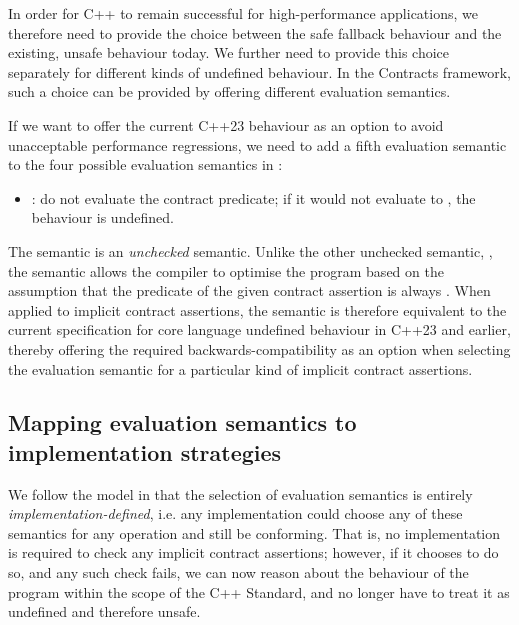 In order for C++ to remain successful for high-performance applications, we therefore need to provide the choice between the safe fallback behaviour and the existing, unsafe behaviour today. We further need to provide this choice separately for different kinds of undefined behaviour. In the Contracts framework, such a choice can be provided by offering different evaluation semantics.

If we want to offer the current C++23 behaviour as an option to avoid unacceptable performance regressions, we need to add a fifth evaluation semantic to the four possible evaluation semantics in \cite{P2900R6}:
\begin{itemize}
\item {}: do not evaluate the contract predicate; if it would not evaluate to , the behaviour is undefined.
\end{itemize}
The  semantic is an \emph{unchecked} semantic. Unlike the other unchecked semantic, , the  semantic allows the compiler to optimise the program based on the assumption that the predicate of the given contract assertion is always . When applied to implicit contract assertions, the  semantic is therefore equivalent to the current specification for core language undefined behaviour in C++23 and earlier, thereby offering the required backwards-compatibility as an option when selecting the evaluation semantic for a particular kind of implicit contract assertions.

\subsection{Mapping evaluation semantics to implementation strategies}

We follow the model in \cite{P2900R6} that the selection of evaluation semantics is entirely \emph{implementation-defined}, i.e. any implementation could choose any of these semantics for any operation and still be conforming. That is, no implementation is required to check any implicit contract assertions; however, if it chooses to do so, and any such check fails, we can now reason about the behaviour of the program within the scope of the C++ Standard, and no longer have to treat it as undefined and therefore unsafe.

